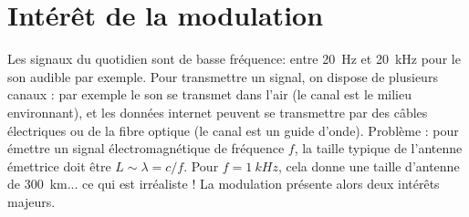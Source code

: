 




\section{Intérêt de la modulation}
\label{sec:théorie}
Les signaux du quotidien sont de basse fréquence: entre \SI{20}{Hz} et \SI{20}{kHz} pour le son audible par exemple. Pour transmettre un signal, on dispose de plusieurs canaux : par exemple le son se transmet dans l’air (le canal est le milieu environnant), et les données internet peuvent se transmettre par des  câbles électriques ou de la fibre optique (le canal est un guide d'onde). Problème : pour émettre un signal électromagnétique de fréquence $f$, la taille typique de l'antenne émettrice doit être $L\sim \lambda=c/f$. Pour $f=\SI{1}{kHz}$, cela donne une taille d'antenne de \SI{300}{km}... ce qui est irréaliste ! La modulation présente alors deux intérêts majeurs.



